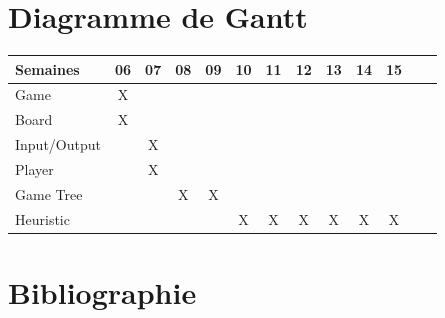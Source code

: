 \documentclass[10pt,a4paper]{article}
\begin{document}
\newpage
\section{Diagramme de Gantt}
\begin{center}
  \begin{tabular}{| l | c | c | c | c | c | c | c | c | c | c | c | c |}
    \hline
    Semaines     & 06 & 07 & 08 & 09 & 10 & 11 & 12 & 13 & 14 & 15  \\ \hline
    Game         & X  &    &    &    &    &    &    &    &    &     \\ \hline
    Board        & X  &    &    &    &    &    &    &    &    &     \\ \hline
    Input/Output &    & X  &    &    &    &    &    &    &    &     \\ \hline
    Player       &    & X  &    &    &    &    &    &    &    &     \\ \hline
    Game Tree    &    &    & X  & X  &    &    &    &    &    &     \\ \hline
    Heuristic    &    &    &    &    &  X & X  & X  & X  & X  & X   \\ \hline
  \end{tabular}
\end{center}

\section{Bibliographie}


\nocite{*}
\end{document}
